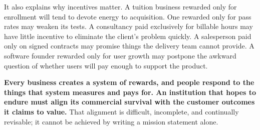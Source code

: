 It also explains why incentives matter. A tuition business rewarded only for enrollment will tend to devote energy to acquisition. One rewarded only for pass rates may weaken its tests. A consultancy paid exclusively for billable hours may have little incentive to eliminate the client's problem quickly. A salesperson paid only on signed contracts may promise things the delivery team cannot provide. A software founder rewarded only for user growth may postpone the awkward question of whether users will pay enough to support the product.

\textbf{Every business creates a system of rewards, and people respond to the things that system measures and pays for. An institution that hopes to endure must align its commercial survival with the customer outcomes it claims to value.} That alignment is difficult, incomplete, and continually revisable; it cannot be achieved by writing a mission statement alone.
